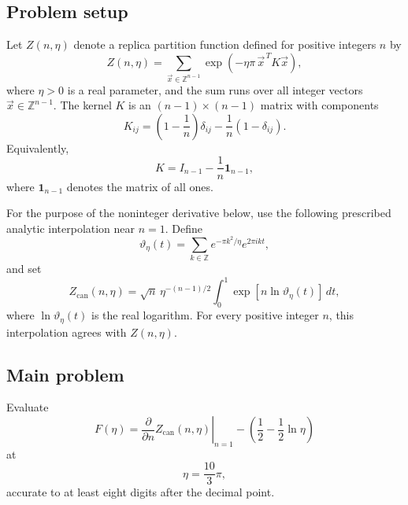 
\subsection*{Problem setup}

Let \(Z(n,\eta)\) denote a replica partition function defined for positive
integers \(n\) by
\begin{equation}
Z(n,\eta)
=
\sum_{\vec{x}\in\mathbb{Z}^{n-1}}
\exp\!\left(-\eta\pi\,\vec{x}^{\,T}K\vec{x}\right),
\tag{38}
\end{equation}
where \(\eta>0\) is a real parameter, and the sum runs over all integer
vectors \(\vec{x}\in\mathbb{Z}^{n-1}\). The kernel \(K\) is an
\((n-1)\times(n-1)\) matrix with components
\begin{equation}
K_{ij}
=
\left(1-\frac{1}{n}\right)\delta_{ij}
-
\frac{1}{n}(1-\delta_{ij}).
\tag{39}
\end{equation}
Equivalently,
\[
K=I_{n-1}-\frac{1}{n}\mathbf{1}_{n-1},
\]
where \(\mathbf{1}_{n-1}\) denotes the matrix of all ones.

For the purpose of the noninteger derivative below, use the following
prescribed analytic interpolation near \(n=1\). Define
\[
\vartheta_{\eta}(t)
=
\sum_{k\in\mathbb{Z}}
e^{-\pi k^2/\eta}e^{2\pi i k t},
\]
and set
\[
Z_{\mathrm{can}}(n,\eta)
=
\sqrt{n}\,\eta^{-(n-1)/2}
\int_0^1
\exp\!\left[n\ln\vartheta_{\eta}(t)\right]\,dt,
\]
where \(\ln\vartheta_{\eta}(t)\) is the real logarithm. For every positive
integer \(n\), this interpolation agrees with \(Z(n,\eta)\).

\subsection*{Main problem}

Evaluate
\begin{equation}
F(\eta)
=
\left.
\frac{\partial}{\partial n}
Z_{\mathrm{can}}(n,\eta)
\right|_{n=1}
-
\left(
\frac{1}{2}-\frac{1}{2}\ln\eta
\right)
\tag{40}
\end{equation}
at
\[
\eta=\frac{10}{3}\pi,
\]
accurate to at least eight digits after the decimal point.
